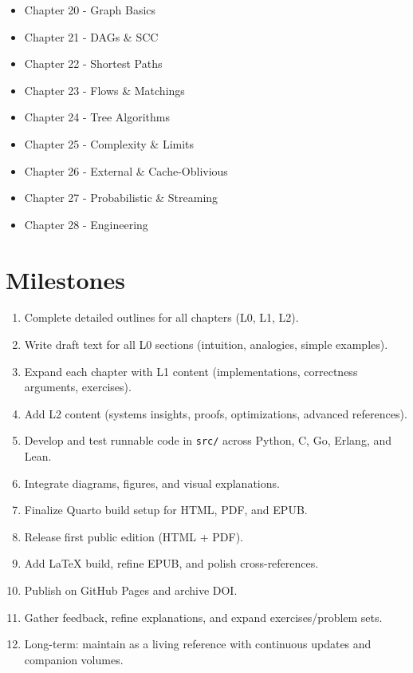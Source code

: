 \documentclass[
  letterpaper,
  DIV=11,
  numbers=noendperiod]{scrreprt}
\providecommand{\tightlist}{%
  \setlength{\itemsep}{0pt}\setlength{\parskip}{0pt}}
\begin{document}
\begin{itemize}
\tightlist
\item
  Chapter 20 - Graph Basics
\item
  Chapter 21 - DAGs \& SCC
\item
  Chapter 22 - Shortest Paths
\item
  Chapter 23 - Flows \& Matchings
\item
  Chapter 24 - Tree Algorithms
\item
  Chapter 25 - Complexity \& Limits
\item
  Chapter 26 - External \& Cache-Oblivious
\item
  Chapter 27 - Probabilistic \& Streaming
\item
  Chapter 28 - Engineering
\end{itemize}

\section{Milestones}\label{milestones}

\begin{enumerate}
\def\labelenumi{\arabic{enumi}.}
\tightlist
\item
  Complete detailed outlines for all chapters (L0, L1, L2).
\item
  Write draft text for all L0 sections (intuition, analogies, simple
  examples).
\item
  Expand each chapter with L1 content (implementations, correctness
  arguments, exercises).
\item
  Add L2 content (systems insights, proofs, optimizations, advanced
  references).
\item
  Develop and test runnable code in \texttt{src/} across Python, C, Go,
  Erlang, and Lean.
\item
  Integrate diagrams, figures, and visual explanations.
\item
  Finalize Quarto build setup for HTML, PDF, and EPUB.
\item
  Release first public edition (HTML + PDF).
\item
  Add LaTeX build, refine EPUB, and polish cross-references.
\item
  Publish on GitHub Pages and archive DOI.
\item
  Gather feedback, refine explanations, and expand exercises/problem
  sets.
\item
  Long-term: maintain as a living reference with continuous updates and
  companion volumes.
\end{enumerate}
\end{document}
